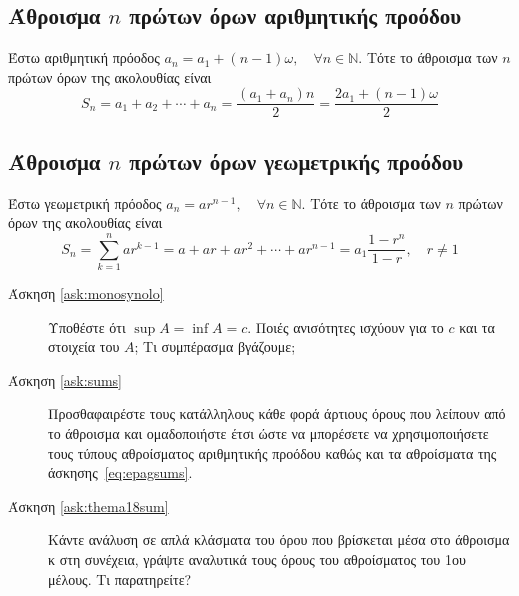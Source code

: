   \subsection*{Άθροισμα $n$ πρώτων όρων αριθμητικής προόδου}
  Έστω αριθμητική πρόοδος $a_{n} = a_{1} + (n-1)\omega, \quad \forall n \in \mathbb{N}$.
  Τότε το άθροισμα των $n$ πρώτων όρων της ακολουθίας είναι
  \[
    S_{n} = a_{1} + a_{2} + \cdots + a_{n} = \frac{(a_{1} + a_{n})n}{2} =
    \frac{2a_{1}+(n-1)\omega}{2}
  \]
  \subsection*{Άθροισμα $n$ πρώτων όρων γεωμετρικής προόδου}
  Έστω γεωμετρική πρόοδος $ a_{n} = a r^{n-1}, \quad \forall n \in \mathbb{N} $.
  Τότε το άθροισμα των $n$ πρώτων όρων της ακολουθίας είναι
  \[
    S_{n} = \sum_{k=1}^{n} ar^{k-1} = a + ar + ar^{2} + \cdots + ar^{n-1} = 
    a_{1}\frac{1 - r^{n}}{1-r}, \quad r \neq 1 
  \] 

  \begin{description}
    \item [Άσκηση \ref{ask:monosynolo}] Υποθέστε ότι $ \sup A = \inf A = c
      $. Ποιές ανισότητες ισχύουν για το $c$ και τα στοιχεία του $A$; 
      Τι συμπέρασμα βγάζουμε;

    \item [Άσκηση \ref{ask:sums}] Προσθαφαιρέστε τους κατάλληλους κάθε φορά  
      άρτιους όρους που λείπουν από το άθροισμα και ομαδοποιήστε έτσι ώστε να 
      μπορέσετε να χρησιμοποιήσετε τους τύπους αθροίσματος αριθμητικής προόδου 
      καθώς και τα αθροίσματα της άσκησης~\ref{eq:epagsums}.

    \item [Άσκηση \ref{ask:thema18sum}] Κάντε ανάλυση σε απλά κλάσματα 
      του όρου που βρίσκεται μέσα στο άθροισμα κ στη συνέχεια, γράψτε
      αναλυτικά τους όρους του αθροίσματος του 1ου μέλους. Τι παρατηρείτε?
  \end{description}
  
